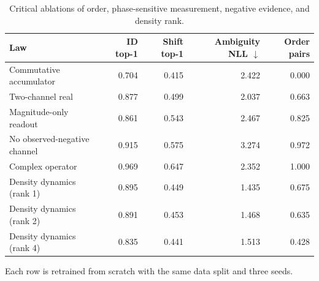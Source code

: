 \begin{table}[t]
\centering
\caption{Critical ablations of order, phase-sensitive measurement, negative evidence, and density rank.}
\label{tab:critical_ablations}
\begin{tabular}{lrrrr}
\toprule
Law & ID top-1 & Shift top-1 & Ambiguity NLL $\downarrow$ & Order pairs \\
\midrule
Commutative accumulator & 0.704 & 0.415 & 2.422 & 0.000 \\
Two-channel real & 0.877 & 0.499 & 2.037 & 0.663 \\
Magnitude-only readout & 0.861 & 0.543 & 2.467 & 0.825 \\
No observed-negative channel & 0.915 & 0.575 & 3.274 & 0.972 \\
Complex operator & 0.969 & 0.647 & 2.352 & 1.000 \\
Density dynamics (rank 1) & 0.895 & 0.449 & 1.435 & 0.675 \\
Density dynamics (rank 2) & 0.891 & 0.453 & 1.468 & 0.635 \\
Density dynamics (rank 4) & 0.835 & 0.441 & 1.513 & 0.428 \\
\bottomrule
\end{tabular}
\begin{minipage}{0.96\linewidth}\footnotesize Each row is retrained from scratch with the same data split and three seeds.\end{minipage}
\end{table}
